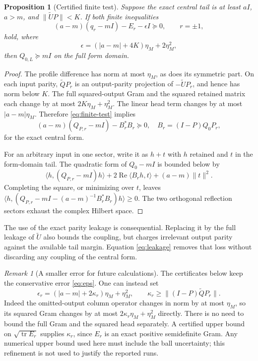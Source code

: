 \documentclass[11pt]{article}
\numberwithin{equation}{section}
\newtheorem{proposition}[theorem]{Proposition}
\theoremstyle{definition}
\theoremstyle{remark}
\newtheorem{remark}[theorem]{Remark}
\newcommand{\Rea}{\operatorname{Re}}
\newcommand{\tr}{\operatorname{tr}}
\newcommand{\norm}[1]{\lVert#1\rVert}
\newcommand{\ip}[2]{\langle#1,#2\rangle}
\begin{document}
\begin{proposition}[Certified finite test]\label{prop:schur}
Suppose the exact central tail is at least $aI$, $a>m$, and
$\norm{\widetilde UP}<K$. If both finite inequalities
\begin{equation}\label{eq:finite-test}
 (a-m)(q_r-mI)-E_r-\epsilon I\succeq0,
 \qquad r=\pm1,
\end{equation}
hold, where
\begin{equation}\label{eq:eps}
 \epsilon=(|a-m|+4K)\eta_M+2\eta_M^2,
\end{equation}
then $Q_{0,L}\succeq mI$ on the full form domain.
\end{proposition}
\begin{proof}
The profile difference has norm at most $\eta_M$, as does its symmetric
part. On each input parity, $\widetilde QP_r$ is an output-parity projection
of $-\widetilde UP_r$, and hence has norm below $K$. The full squared-output
Gram and the squared retained matrix each change by at most
$2K\eta_M+\eta_M^2$. The linear head term changes by at most
$|a-m|\eta_M$. Therefore \eqref{eq:finite-test} implies
\[
 (a-m)(Q_{P,r}-mI)-B_r^*B_r\succeq0,
 \quad B_r=(I-P)Q_0P_r,
\]
for the exact central form.

For an arbitrary input in one sector, write it as $h+t$ with $h$ retained
and $t$ in the form-domain tail. The quadratic form of $Q_0-mI$ is bounded
below by
\[
 \ip h{(Q_{P,r}-mI)h}
 +2\Rea\ip{B_rh}t+(a-m)\norm t^2.
\]
Completing the square, or minimizing over $t$, leaves
$\ip h{(Q_{P,r}-mI-(a-m)^{-1}B_r^*B_r)h}\ge0$.
The two orthogonal reflection sectors exhaust the complex Hilbert space.
\end{proof}

The use of the exact parity leakage is consequential. Replacing it by
the full leakage of $\widetilde U$ also bounds the coupling, but charges
irrelevant output parity against the available tail margin. Equation
\eqref{eq:leakage} removes that loss without discarding any coupling of
the central form.

\begin{remark}[A smaller error for future calculations]\label{rem:sharper-error}
The certificates below keep the conservative error \eqref{eq:eps}.
One can instead set
\[
 \epsilon_r=(|a-m|+2\kappa_r)\eta_M+\eta_M^2,
 \qquad \kappa_r\ge\norm{(I-P)\widetilde QP_r}.
\]
Indeed the omitted-output column operator changes in norm by at most
$\eta_M$, so its squared Gram changes by at most
$2\kappa_r\eta_M+\eta_M^2$ directly. There is no need to bound the full
Gram and the squared head separately. A certified upper bound on
$\sqrt{\tr E_r}$ supplies $\kappa_r$, since $E_r$ is an exact positive
semidefinite Gram. Any numerical upper bound used here must include the
ball uncertainty; this refinement is not used to justify the reported runs.
\end{remark}
\end{document}
